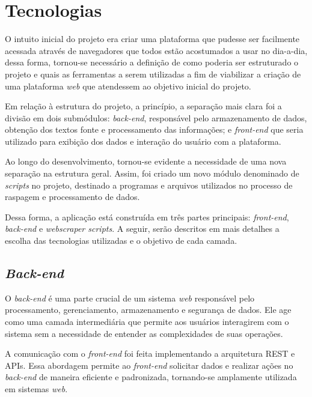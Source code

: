 
\chapter{Tecnologias}

O intuito inicial do projeto era criar uma plataforma que pudesse ser
facilmente acessada através de navegadores que todos estão acostumados a usar
no dia-a-dia, dessa forma, tornou-se necessário a definição de como poderia ser
estruturado o projeto e quais as ferramentas a serem utilizadas a fim de
viabilizar a criação de uma plataforma \textit{web} que atendessem ao objetivo
inicial do projeto.

Em relação à estrutura do projeto, a princípio, a separação mais clara foi a
divisão em dois submódulos: \textit{back-end}, responsável pelo armazenamento
de dados, obtenção dos textos fonte e processamento das informações; e
\textit{front-end} que seria utilizado para exibição dos dados e interação do
usuário com a plataforma.

Ao longo do desenvolvimento, tornou-se evidente a necessidade de uma nova
separação na estrutura geral. Assim, foi criado um novo módulo denominado de
\textit{scripts} no projeto, destinado a programas e arquivos utilizados no
processo de raspagem e processamento de dados.

Dessa forma, a aplicação está construída em três partes principais:
\textit{front-end}, \textit{back-end} e \textit{webscraper scripts}. A seguir,
serão descritos em mais detalhes a escolha das tecnologias utilizadas e o
objetivo de cada camada.

\section{\textit{Back-end}}

O \textit{back-end} é uma parte crucial de um sistema \textit{web} responsável
pelo processamento, gerenciamento, armazenamento e segurança de dados. Ele age
como uma camada intermediária que permite aos usuários interagirem com o
sistema sem a necessidade de entender as complexidades de suas operações.

A comunicação com o \textit{front-end} foi feita implementando a arquitetura
\ac{REST} e \acp{API}. Essa abordagem permite ao \textit{front-end} solicitar
dados e realizar ações no \textit{back-end} de maneira eficiente e padronizada,
tornando-se amplamente utilizada em sistemas \textit{web}.

